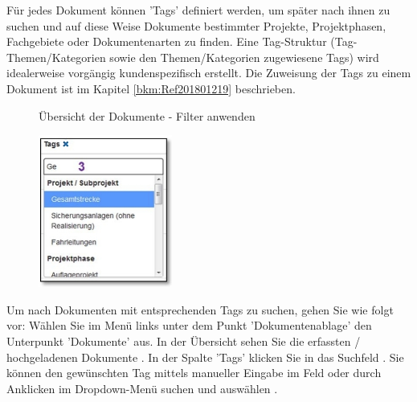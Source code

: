 Für jedes Dokument können 'Tags' definiert werden, um später nach ihnen zu suchen und auf diese Weise Dokumente bestimmter Projekte, Projektphasen, Fachgebiete oder Dokumentenarten zu finden. Eine Tag-Struktur (Tag-Themen/Kategorien sowie den Themen/Kategorien zugewiesene Tags) wird idealerweise vorgängig kundenspezifisch erstellt. Die Zuweisung der Tags zu einem Dokument ist im Kapitel \ref{bkm:Ref201801219} beschrieben.

\begin{figure}[H]
\caption{Übersicht der Dokumente - Filter anwenden}
\end{figure}

\begin{figure}
\vspace{-20pt}
\includegraphics[height=50mm]{../chapters/11_Dokumentenablage/pictures/11-2-8_DokTagHinzufuegen.jpg}
\end{figure}
Um nach Dokumenten mit entsprechenden Tags zu suchen, gehen Sie wie folgt vor:
Wählen Sie im Menü links unter dem Punkt 'Dokumentenablage' den Unterpunkt 'Dokumente' aus. In der Übersicht sehen Sie die erfassten / hochgeladenen Dokumente . In der Spalte 'Tags' klicken Sie in das Suchfeld . Sie können den gewünschten Tag mittels manueller Eingabe im Feld oder durch Anklicken im Dropdown-Menü suchen und auswählen .

\vspace{\baselineskip}

